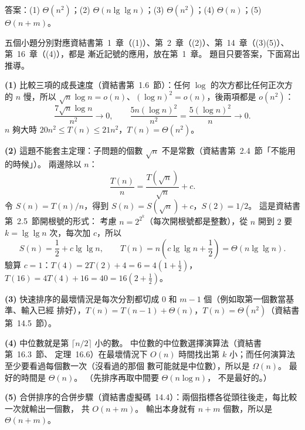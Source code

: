 \begin{pastsoln}
答案：(1) $\Theta(n^2)$；(2) $\Theta(n \lg \lg n)$；(3) $\Theta(n^2)$；(4) $\Theta(n)$；(5) $\Theta(n + m)$。

五個小題分別對應資結書第~1~章（(1)）、第~2~章（(2)）、第~14~章（(3)(5)）、第~16~章（(4)），都是
漸近記號的應用，放在第~1~章。 題目只要答案，下面寫出推導。

\textbf{(1)} 比較三項的成長速度（資結書第~1.6~節）：任何 $\log$ 的次方都比任何正次方的 $n$ 慢，所以
$\sqrt{n}\log n = o(n)$、$(\log n)^2 = o(n)$，後兩項都是 $o(n^2)$：
\[
\frac{7\sqrt{n}\log n}{n^2} \to 0, \qquad \frac{5n(\log n)^2}{n^2} = \frac{5(\log n)^2}{n} \to 0 .
\]
$n$ 夠大時 $20n^2 \le T(n) \le 21n^2$，$T(n) = \Theta(n^2)$。

\textbf{(2)} 這題不能套主定理：子問題的個數 $\sqrt{n}$ 不是常數（資結書第~2.4~節「不能用的時候」）。
兩邊除以 $n$：
\[
\frac{T(n)}{n} = \frac{T(\sqrt{n})}{\sqrt{n}} + c .
\]
令 $S(n) = T(n)/n$，得到 $S(n) = S(\sqrt{n}) + c$，$S(2) = 1/2$。 這是資結書第~2.5~節開根號的形式：
考慮 $n = 2^{2^k}$（每次開根號都是整數），從 $n$ 開到 $2$ 要 $k = \lg \lg n$ 次，每次加 $c$，所以
\[
S(n) = \frac{1}{2} + c \lg \lg n, \qquad T(n) = n \left(c \lg \lg n + \frac{1}{2}\right)
= \Theta(n \lg \lg n).
\]
驗算 $c = 1$：$T(4) = 2T(2) + 4 = 6 = 4(1 + \frac{1}{2})$，
$T(16) = 4T(4) + 16 = 40 = 16(2 + \frac{1}{2})$。

\textbf{(3)} 快速排序的最壞情況是每次分割都切成 $0$ 和 $m - 1$ 個（例如取第一個數當基準、輸入已經
排好），$T(n) = T(n - 1) + \Theta(n)$，$T(n) = \Theta(n^2)$（資結書第~14.5~節）。

\textbf{(4)} 中位數就是第 $\lceil n/2 \rceil$ 小的數。 中位數的中位數選擇演算法（資結書第~16.3~節、
定理~16.6）在最壞情況下 $O(n)$ 時間找出第 $k$ 小；而任何演算法至少要看過每個數一次（沒看過的那個
數可能就是中位數），所以是 $\Omega(n)$。 最好的時間是 $\Theta(n)$。 （先排序再取中間要 $\Theta(n \log n)$，
不是最好的。）

\textbf{(5)} 合併排序的合併步驟（資結書虛擬碼~14.4）：兩個指標各從頭往後走，每比較一次就輸出一個數，
共 $O(n + m)$。 輸出本身就有 $n + m$ 個數，所以是 $\Theta(n + m)$。
\end{pastsoln}
